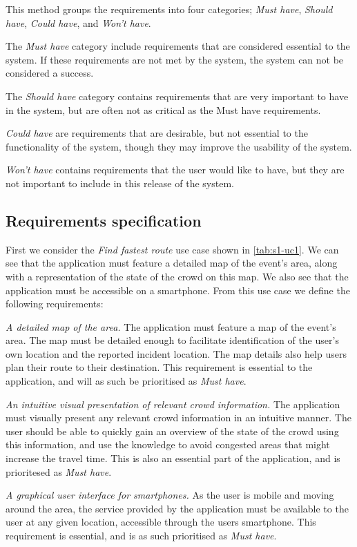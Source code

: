 This method groups the requirements into four categories; \emph{Must have}, \emph{Should have}, \emph{Could have}, and \emph{Won't have}. 

The \emph{Must have} category include requirements that are considered essential to the system. If these requirements are not met by the system, the system can not be considered a success. 

The \emph{Should have} category contains requirements that are very important to have in the system, but are often not as critical as the Must have requirements. 

\emph{Could have} are requirements that are desirable, but not essential to the functionality of the system, though they may improve the usability of the system. 

\emph{Won't have} contains requirements that the user would like to have, but they are not important to include in this release of the system.

\subsection{Requirements specification}
First we consider the \emph{Find fastest route} use case shown in \cref{tab:s1-uc1}. We can see that the application must feature a detailed map of the event's area, along with a representation of the state of the crowd on this map. We also see that the application must be accessible on a smartphone. From this use case we define the following requirements:

\emph{A detailed map of the area.} The application must feature a map of the event's area. The map must be detailed enough to facilitate identification of the user's own location and the reported incident location. The map details also help users plan their route to their destination. This requirement is essential to the application, and will as such be prioritised as \emph{Must have}.

\emph{An intuitive visual presentation of relevant crowd information.} The application must visually present any relevant crowd information in an intuitive manner. The user should be able to quickly gain an overview of the state of the crowd using this information, and use the knowledge to avoid congested areas that might increase the travel time. This is also an essential part of the application, and is prioritesed as \emph{Must have}.

\emph{A graphical user interface for smartphones.} As the user is mobile and moving around the area, the service provided by the application must be available to the user at any given location, accessible through the users smartphone. This requirement is essential, and is as such prioritised as \emph{Must have}.

